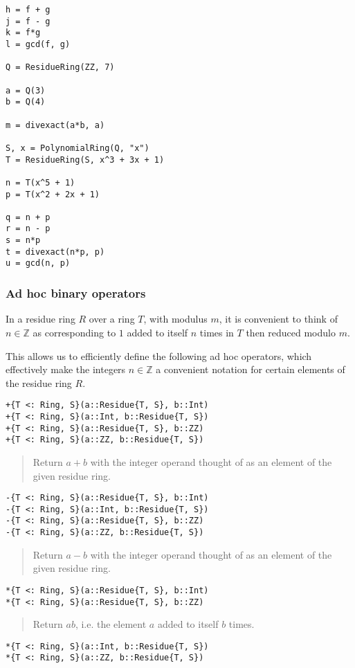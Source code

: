 \documentclass[a4paper,10pt]{article}
\newcommand{\Z}{\mathbb{Z}}
\newcommand{\desc}[1]{\vspace{-3mm}\begin{quote}#1\end{quote}}
\begin{document}
{{{\begin{lstlisting}
h = f + g
j = f - g
k = f*g
l = gcd(f, g)

Q = ResidueRing(ZZ, 7)

a = Q(3)
b = Q(4)

m = divexact(a*b, a)

S, x = PolynomialRing(Q, "x")
T = ResidueRing(S, x^3 + 3x + 1)

n = T(x^5 + 1)
p = T(x^2 + 2x + 1)

q = n + p
r = n - p
s = n*p
t = divexact(n*p, p)
u = gcd(n, p)
\end{lstlisting}

\subsubsection{Ad hoc binary operators}

In a residue ring $R$ over a ring $T$, with modulus $m$, it is convenient
to think of $n \in \Z$ as corresponding to $1$ added to itself $n$ times
in $T$ then reduced modulo $m$.

This allows us to efficiently define the following ad hoc operators, which
effectively make the integers $n \in \Z$ a convenient notation for certain
elements of the residue ring $R$.

\begin{lstlisting}
+{T <: Ring, S}(a::Residue{T, S}, b::Int)
+{T <: Ring, S}(a::Int, b::Residue{T, S})
+{T <: Ring, S}(a::Residue{T, S}, b::ZZ)
+{T <: Ring, S}(a::ZZ, b::Residue{T, S})
\end{lstlisting}

\desc{Return $a + b$ with the integer operand thought of as an element of 
the given residue ring.}

\begin{lstlisting}
-{T <: Ring, S}(a::Residue{T, S}, b::Int)
-{T <: Ring, S}(a::Int, b::Residue{T, S})
-{T <: Ring, S}(a::Residue{T, S}, b::ZZ)
-{T <: Ring, S}(a::ZZ, b::Residue{T, S})
\end{lstlisting}

\desc{Return $a - b$ with the integer operand thought of as an element of 
the given residue ring.}

\begin{lstlisting}
*{T <: Ring, S}(a::Residue{T, S}, b::Int)
*{T <: Ring, S}(a::Residue{T, S}, b::ZZ)
\end{lstlisting}

\desc{Return $ab$, i.e. the element $a$ added to itself $b$ times.}

\begin{lstlisting}
*{T <: Ring, S}(a::Int, b::Residue{T, S})
*{T <: Ring, S}(a::ZZ, b::Residue{T, S})
\end{lstlisting}

}}}
\end{document}
